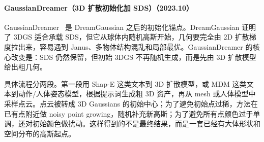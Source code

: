 \paragraph{GaussianDreamer（3D 扩散初始化加 SDS）（2023.10）}
GaussianDreamer~\cite{2310_08529} 是 DreamGaussian 之后的初始化锚点。DreamGaussian 证明了 3DGS 适合承载 SDS，但它从球体内随机高斯开始，几何要完全由 2D 扩散梯度拉出来，容易遇到 Janus、多物体结构混乱和局部最优。GaussianDreamer 的核心改变是：SDS 仍然保留，但初始 3DGS 不再随机生成，而是先由 3D 扩散模型给出粗几何。

具体流程分两段。第一段用 Shap-E 这类文本到 3D 扩散模型，或 MDM 这类文本到动作/人体姿态模型，根据提示词生成粗 3D 资产，再从 mesh 或人体模型中采样点云。点云被转成 3D Gaussians 的初始中心；为了避免初始点过稀，方法在已有点附近做 noisy point growing，随机补充新高斯；为了避免所有点颜色过于单调，还对初始颜色做扰动。这样得到的不是最终结果，而是一套已经有大体形状和空间分布的高斯起点。

